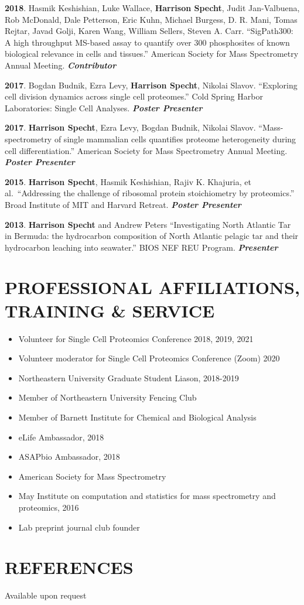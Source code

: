 \documentclass[11pt,]{article}
\providecommand{\tightlist}{%
  \setlength{\itemsep}{0pt}\setlength{\parskip}{0pt}}
\begin{document}
\textbf{2018}. Hasmik Keshishian, Luke Wallace, \textbf{Harrison
Specht}, Judit Jan-Valbuena, Rob McDonald, Dale Petterson, Eric Kuhn,
Michael Burgess, D. R. Mani, Tomas Rejtar, Javad Golji, Karen Wang,
William Sellers, Steven A. Carr. ``SigPath300: A high throughput
MS-based assay to quantify over 300 phosphosites of known biological
relevance in cells and tissues.'' American Society for Mass Spectrometry
Annual Meeting. \emph{\textbf{Contributor}}

\textbf{2017}. Bogdan Budnik, Ezra Levy, \textbf{Harrison Specht},
Nikolai Slavov. ``Exploring cell division dynamics across single cell
proteomes.'' Cold Spring Harbor Laboratories: Single Cell Analyses.
\emph{\textbf{Poster Presenter}}

\textbf{2017}. \textbf{Harrison Specht}, Ezra Levy, Bogdan Budnik,
Nikolai Slavov. ``Mass-spectrometry of single mammalian cells quantifies
proteome heterogeneity during cell differentiation.'' American Society
for Mass Spectrometry Annual Meeting. \emph{\textbf{Poster Presenter}}

\textbf{2015}. \textbf{Harrison Specht}, Hasmik Keshishian, Rajiv K.
Khajuria, et al.~``Addressing the challenge of ribosomal protein
stoichiometry by proteomics.'' Broad Institute of MIT and Harvard
Retreat. \emph{\textbf{Poster Presenter}}

\textbf{2013}. \textbf{Harrison Specht} and Andrew Peters
``Investigating North Atlantic Tar in Bermuda: the hydrocarbon
composition of North Atlantic pelagic tar and their hydrocarbon leaching
into seawater.'' BIOS NEF REU Program. \emph{\textbf{Presenter}}

\hypertarget{professional-affiliations-training-service}{%
\section{PROFESSIONAL AFFILIATIONS, TRAINING \&
SERVICE}\label{professional-affiliations-training-service}}

\begin{itemize}
\tightlist
\item
  Volunteer for Single Cell Proteomics Conference 2018, 2019, 2021
\item
  Volunteer moderator for Single Cell Proteomics Conference (Zoom) 2020
\item
  Northeastern University Graduate Student Liason, 2018-2019
\item
  Member of Northeastern University Fencing Club
\item
  Member of Barnett Institute for Chemical and Biological Analysis
\item
  eLife Ambassador, 2018
\item
  ASAPbio Ambassador, 2018
\item
  American Society for Mass Spectrometry
\item
  May Institute on computation and statistics for mass spectrometry and
  proteomics, 2016
\item
  Lab preprint journal club founder
\end{itemize}

\hypertarget{references}{%
\section{REFERENCES}\label{references}}

Available upon request
\end{document}
